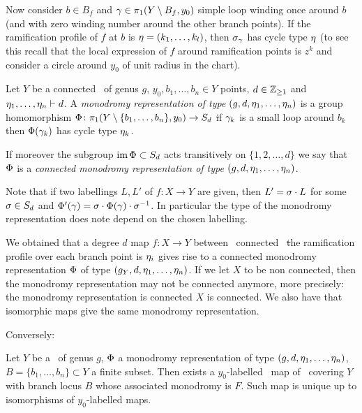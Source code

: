 \documentclass[10pt]{beamer}
\begin{document}

\begin{frame}

Now consider $b\in B_f$ and $\gamma\in\pi_1(Y\setminus B_f,y_0)$ simple loop winding once around $b$ (and with zero winding number around the other branch points). If the ramification profile of $f$ at $b$ is $\eta=(k_1,\ldots,k_l)$, then $\sigma_\gamma$ has cycle type $\eta$ (to see this recall that the local expression of $f$ around ramification points is $z^k$ and consider a circle around $y_0$ of unit radius in the chart).

\begin{definition}
	Let $Y$ be a connected \rs\ of genus $g$, $y_0,b_1,\ldots,b_n\in Y$ points, $d\in\mathbb Z_{\geq1}$ and $\eta_1,\ldots,\eta_n\vdash d$. A \emph{monodromy representation of type} $(g,d,\eta_1,\ldots,\eta_n)$ is a group homomorphism $\Phi\colon\pi_1(Y\setminus\{b_1,\ldots,b_n\},y_0)\to S_d$ \st if $\gamma_k$ is a small loop around $b_k$ then $\Phi(\gamma_k)$ has cycle type $\eta_k$.
	
	If moreover the subgroup $\operatorname{im} \Phi\subset S_d$ acts transitively on $\{1,2,\ldots,d\}$ we say that $\Phi$ is a \emph{connected monodromy representation of type} $(g,d,\eta_1,\ldots,\eta_n)$.
	
\end{definition}

Note that if two labellings $L,L'$ of $f\colon X\to Y$ are given, then $L'=\sigma\cdot L$ for some $\sigma\in S_d$ and $\Phi'(\gamma)=\sigma\cdot\Phi(\gamma)\cdot\sigma^{-1}$. In particular the type of the monodromy representation does note depend on the chosen labelling. 

\end{frame}

\begin{frame}

We obtained that a degree $d$ map $f\colon X\to Y$ between \cpt\ connected \rss\ \st the ramification profile over each branch point is $\eta_i$ gives rise to a connected monodromy representation $\Phi$ of type $(g_Y,d,\eta_1,\ldots,\eta_n)$. If we let $X$ to be non connected, then the monodromy representation may not be connected anymore, more precisely: the monodromy representation is connected \tiff $X$ is connected. We also have that isomorphic maps give the same monodromy representation. 

Conversely:

\begin{theorem}
	Let $Y$ be a \rs\ of genus $g$, $\Phi$ a monodromy representation of type $(g,d,\eta_1,\ldots,\eta_n)$, $B=\{b_1,\ldots,b_n\}\subset Y$ a finite subset. Then exists a $y_0$-labelled \holo\ map of \rs\ covering $Y$ with branch locus $B$ whose associated monodromy is $F$. Such map is unique up to isomorphisms of $y_0$-labelled maps. 
\end{theorem}

\end{frame}
\end{document}
